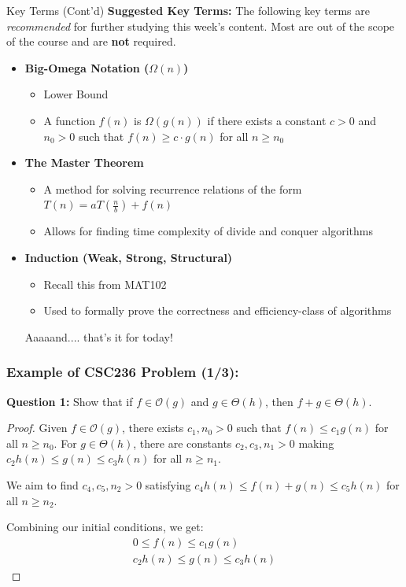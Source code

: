 \documentclass[hyperref={colorlinks,citecolor=blue,linkcolor=blue,urlcolor=blue}, aspectratio=1610]{beamer}
\begin{document}
\begin{frame}{Key Terms (Cont'd)}
  \textbf{Suggested Key Terms:} The following key terms are \textit{recommended} for further studying this week's content. Most are out of the scope of the course and are \textbf{not} required. 
  \begin{itemize} 
    \item \textbf{Big-Omega Notation ($\Omega(n)$)}
    \begin{itemize}
      \item Lower Bound
      \item A function $f(n)$ is $\Omega(g(n))$ if there exists a constant $c > 0$ and $n_0 > 0$ such that $f(n) \geq c \cdot g(n)$ for all $n \geq n_0$
    \end{itemize}
    \item \textbf{The Master Theorem}
    \begin{itemize}
      \item A method for solving recurrence relations of the form $T(n) = aT\left(\frac{n}{b}\right) + f(n)$
      \item Allows for finding time complexity of divide and conquer algorithms
    \end{itemize}
    \item \textbf{Induction (Weak, Strong, Structural)}
    \begin{itemize}
      \item Recall this from MAT102
      \item Used to formally prove the correctness and efficiency-class of algorithms
    \end{itemize}
    Aaaaand.... that's it for today! 
  \end{itemize}
\end{frame}

\begin{frame}
  \frametitle{Example of CSC236 Problem (1/3):}
  \textbf{Question 1:} Show that if $f \in \mathcal{O}(g)$ and $g \in \Theta(h)$, then $f + g \in \Theta(h)$.

  \begin{proof}
    Given $f \in \mathcal{O}(g)$, there exists $c_1, n_0 > 0$ such that $f(n) \leq c_1g(n)$ for all $n \geq n_0$. For $g \in \Theta(h)$, there are constants $c_2, c_3, n_1 > 0$ making $c_2h(n) \leq g(n) \leq c_3h(n)$ for all $n \geq n_1$.

    We aim to find $c_4, c_5, n_2 > 0$ satisfying $c_4h(n) \leq f(n) + g(n) \leq c_5h(n)$ for all $n \geq n_2$.

    Combining our initial conditions, we get:
    \begin{align*}
        0 \leq f(n) \leq c_1g(n) \\
        c_2h(n) \leq g(n) \leq c_3h(n)
    \end{align*}
  \end{proof}
\end{frame}
\end{document}
